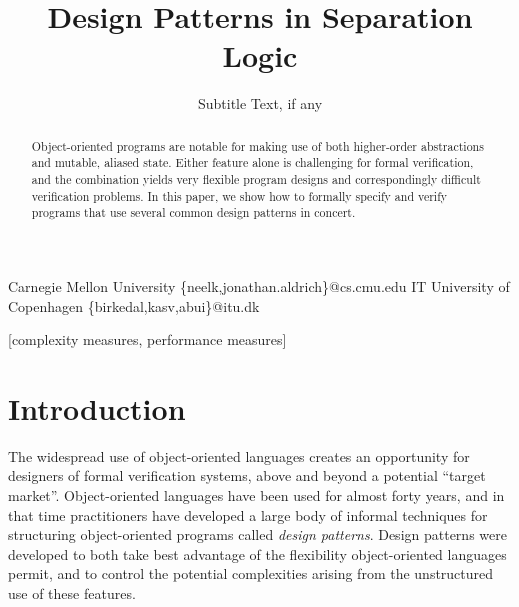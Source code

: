 \documentclass[preprint,natbib]{sigplanconf}
\begin{document}
\copyrightdata{[to be supplied]} 


\title{Design Patterns in Separation Logic}
\subtitle{Subtitle Text, if any}

           {Carnegie Mellon University}
           {\{neelk,jonathan.aldrich\}@cs.cmu.edu}
           {IT University of Copenhagen}
           {\{birkedal,kasv,abui\}@itu.dk}

\maketitle

\begin{abstract}
Object-oriented programs are notable for making use of both
higher-order abstractions and mutable, aliased state. Either feature
alone is challenging for formal verification, and the combination
yields very flexible program designs and correspondingly difficult
verification problems. In this paper, we show how to
formally specify and verify programs that use several common design
patterns in concert.
\end{abstract}

[complexity measures, performance measures]



\section{Introduction}

The widespread use of object-oriented languages creates an opportunity
for designers of formal verification systems, above and beyond a
potential ``target market''. Object-oriented languages have been used
for almost forty years, and in that time practitioners have developed
a large body of informal techniques for structuring object-oriented
programs called \emph{design patterns}\cite{GoF}.  Design patterns
were developed to both take best advantage of the flexibility
object-oriented languages permit, and to control the potential
complexities arising from the unstructured use of these features.
\end{document}
